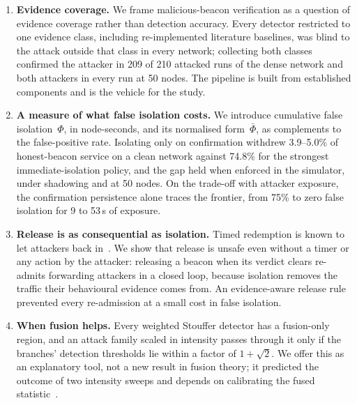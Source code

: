 \documentclass[pdflatex,sn-mathphys-num]{sn-jnl}%
\theoremstyle{thmstyleone}%
\theoremstyle{thmstyletwo}%
\theoremstyle{thmstylethree}%
\begin{document}
\begin{enumerate}
\item \textbf{Evidence coverage.} We frame malicious-beacon verification as a
      question of evidence coverage rather than detection accuracy. Every
      detector restricted to one evidence class, including re-implemented
      literature baselines, was blind to the attack outside that class in
      every network; collecting both classes confirmed the attacker in 209 of
      210 attacked runs of the dense network and both attackers in every run
      at 50 nodes. The pipeline is built from established components and is
      the vehicle for the study.

\item \textbf{A measure of what false isolation costs.} We introduce
      cumulative false isolation~$\Phi$, in node-seconds, and its normalised
      form~$\bar\Phi$, as complements to the false-positive rate. Isolating
      only on confirmation withdrew 3.9--5.0\% of honest-beacon service on a
      clean network against 74.8\% for the strongest immediate-isolation
      policy, and the gap held when enforced in the simulator, under
      shadowing and at 50 nodes. On the trade-off with attacker exposure, the
      confirmation persistence alone traces the frontier, from 75\% to zero
      false isolation for 9 to 53\,s of exposure.

\item \textbf{Release is as consequential as isolation.} Timed redemption is
      known to let attackers back in~\cite{bansal2003ocean,sen2010survey}. We
      show that release is unsafe even without a timer or any action by the
      attacker: releasing a beacon when its verdict clears re-admits
      forwarding attackers in a closed loop, because isolation removes the
      traffic their behavioural evidence comes from. An evidence-aware release
      rule prevented every re-admission at a small cost in false isolation.

\item \textbf{When fusion helps.} Every weighted Stouffer detector has a
      fusion-only region, and an attack family scaled in intensity passes
      through it only if the branches' detection thresholds lie within a
      factor of $1+\sqrt{2}$. We offer this as an explanatory tool, not a new
      result in fusion theory; it predicted the outcome of two intensity
      sweeps and depends on calibrating the fused
      statistic~\cite{stouffer1949,whitlock2005weighted}.


\end{enumerate}
\end{document}
